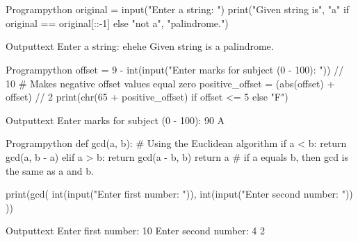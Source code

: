 \documentclass[11pt]{ipu-python}
\begin{document}
    \\~\\
    \begin{code}
        {Program}{python}
original = input("Enter a string: ")
print("Given string is", "a" if original == original[::-1] else "not a", "palindrome.")
    \end{code}
    \begin{code}
        {Output}{text}
Enter a string: ehehe
Given string is a palindrome.
    \end{code}

    \begin{code}
        {Program}{python}
offset = 9 - int(input("Enter marks for subject (0 - 100): ")) // 10
# Makes negative offset values equal zero
positive_offset = (abs(offset) + offset) // 2
print(chr(65 + positive_offset) if offset <= 5 else "F")
    \end{code}
    \begin{code}
        {Output}{text}
Enter marks for subject (0 - 100): 90
A
    \end{code}

    \begin{code}
        {Program}{python}
def gcd(a, b):
    # Using the Euclidean algorithm
    if a < b:
        return gcd(a, b - a)
    elif a > b:
        return gcd(a - b, b)
    return a # if a equals b, then gcd is the same as a and b.


print(gcd(
    int(input("Enter first number: ")),
    int(input("Enter second number: "))
))
    \end{code}
    \begin{code}
        {Output}{text}
Enter first number: 10
Enter second number: 4
2
    \end{code}
\end{document}

